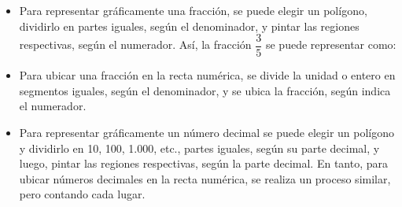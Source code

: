 \documentclass[spanish,letterpaper, 11pt, addpoints, answers]{exam}
\begin{document}
\begin{itemize}
  \item Para representar gráficamente una fracción, se puede elegir un polígono, dividirlo en partes iguales, según el denominador, y pintar las regiones respectivas, según el numerador. Así, la fracción $\dfrac{3}{5}$ se puede representar como:
    \begin{figure}[h]
      \centering
      
    \end{figure}
  
  \item Para ubicar una fracción en la recta numérica, se divide la unidad o entero en segmentos iguales, según el denominador, y se ubica la fracción, según indica el numerador.
  
  \begin{figure}[h]
    \centering
    
  \end{figure}

  
  \item Para representar gráficamente un número decimal se puede elegir un polígono y dividirlo en 10, 100, 1.000, etc., partes iguales, según su parte decimal, y luego, pintar las regiones respectivas, según la parte decimal. En tanto, para ubicar números decimales en la recta numérica, se realiza un proceso similar, pero contando cada lugar.


    

          
  \end{itemize}
    
\end{document}
